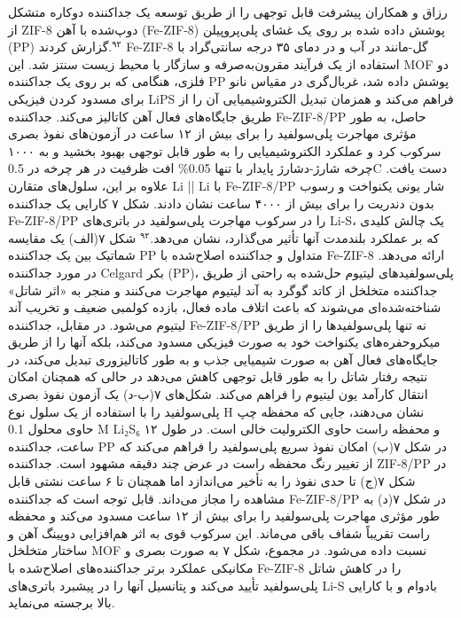 \documentclass[12pt,a4paper,twocolumn]{article} %
\newcommand{\persian}[1]{\textfarsi{#1}}
\newcommand{\english}[1]{\textenglish{#1}}
\begin{document}
\persian{
رزاق و همکاران پیشرفت قابل توجهی را از طریق توسعه یک جداکننده دوکاره متشکل از \english{ZIF-8} دوپ‌شده با آهن (\english{Fe-ZIF-8}) پوشش داده شده بر روی یک غشای پلی‌پروپیلن (\english{PP}) گزارش کردند.$^{۹۲}$ \english{Fe-ZIF-8} گل-مانند در آب و در دمای ۳۵ درجه سانتی‌گراد با استفاده از یک فرآیند مقرون‌به‌صرفه و سازگار با محیط زیست سنتز شد. این \english{MOF} دو فلزی، هنگامی که بر روی یک جداکننده \english{PP} پوشش داده شد، غربال‌گری در مقیاس نانو برای مسدود کردن فیزیکی \english{LiPS} فراهم می‌کند و همزمان تبدیل الکتروشیمیایی آن را از طریق جایگاه‌های فعال آهن کاتالیز می‌کند. جداکننده \english{Fe-ZIF-8/PP} حاصل، به طور مؤثری مهاجرت پلی‌سولفید را برای بیش از ۱۲ ساعت در آزمون‌های نفوذ بصری سرکوب کرد و عملکرد الکتروشیمیایی را به طور قابل توجهی بهبود بخشید و به ۱۰۰۰ چرخه شارژ-دشارژ پایدار با تنها \english{0.05\%} افت ظرفیت در هر چرخه در \english{0.5C} دست یافت. علاوه بر این، سلول‌های متقارن \english{Li || Li} با \english{Fe-ZIF-8/PP} شار یونی یکنواخت و رسوب بدون دندریت را برای بیش از ۴۰۰۰ ساعت نشان دادند.
}
\persian{
شکل ۷ کارایی یک جداکننده \english{Fe-ZIF-8/PP} را در سرکوب مهاجرت پلی‌سولفید در باتری‌های \english{Li-S}، یک چالش کلیدی که بر عملکرد بلندمدت آنها تأثیر می‌گذارد، نشان می‌دهد.$^{۹۲}$ شکل ۷(الف) یک مقایسه شماتیک بین یک جداکننده \english{PP} متداول و جداکننده اصلاح‌شده با \english{Fe-ZIF-8} ارائه می‌دهد. در مورد جداکننده \english{Celgard} بکر (\english{PP})، پلی‌سولفیدهای لیتیوم حل‌شده به راحتی از طریق جداکننده متخلخل از کاتد گوگرد به آند لیتیوم مهاجرت می‌کنند و منجر به «اثر شاتل» شناخته‌شده‌ای می‌شوند که باعث اتلاف ماده فعال، بازده کولمبی ضعیف و تخریب آند لیتیوم می‌شود. در مقابل، جداکننده \english{Fe-ZIF-8/PP} نه تنها پلی‌سولفیدها را از طریق میکروحفره‌های یکنواخت خود به صورت فیزیکی مسدود می‌کند، بلکه آنها را از طریق جایگاه‌های فعال آهن به صورت شیمیایی جذب و به طور کاتالیزوری تبدیل می‌کند، در نتیجه رفتار شاتل را به طور قابل توجهی کاهش می‌دهد در حالی که همچنان امکان انتقال کارآمد یون لیتیوم را فراهم می‌کند. شکل‌های ۷(ب-د) یک آزمون نفوذ بصری پلی‌سولفید را با استفاده از یک سلول نوع \english{H} نشان می‌دهند، جایی که محفظه چپ حاوی محلول \english{0.1 M Li₂S₆} و محفظه راست حاوی الکترولیت خالی است. در طول ۱۲ ساعت، جداکننده \english{PP} در شکل ۷(ب) امکان نفوذ سریع پلی‌سولفید را فراهم می‌کند که از تغییر رنگ محفظه راست در عرض چند دقیقه مشهود است. جداکننده \english{ZIF-8/PP} در شکل ۷(ج) تا حدی نفوذ را به تأخیر می‌اندازد اما همچنان تا ۶ ساعت نشتی قابل مشاهده را مجاز می‌داند. قابل توجه است که جداکننده \english{Fe-ZIF-8/PP} در شکل ۷(د) به طور مؤثری مهاجرت پلی‌سولفید را برای بیش از ۱۲ ساعت مسدود می‌کند و محفظه راست تقریباً شفاف باقی می‌ماند. این سرکوب قوی به اثر هم‌افزایی دوپینگ آهن و ساختار متخلخل \english{MOF} نسبت داده می‌شود. در مجموع، شکل ۷ به صورت بصری و مکانیکی عملکرد برتر جداکننده‌های اصلاح‌شده با \english{Fe-ZIF-8} را در کاهش شاتل پلی‌سولفید تأیید می‌کند و پتانسیل آنها را در پیشبرد باتری‌های \english{Li-S} بادوام و با کارایی بالا برجسته می‌نماید.
}
\end{document}
